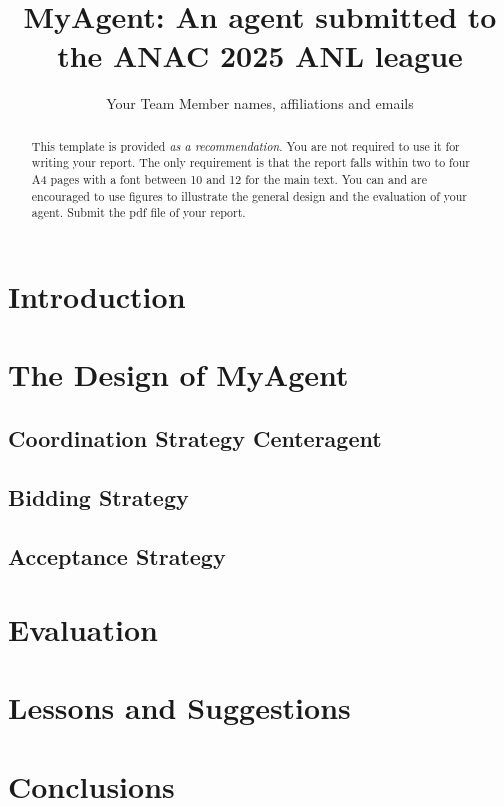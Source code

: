 \documentclass{article}
\title{MyAgent: An agent submitted to the ANAC 2025 ANL league}
\author{Your Team Member names, affiliations and emails}
\begin{document}
\maketitle
\begin{abstract}
	This template is provided \emph{as a recommendation}. You are not required
	to use it for writing your report. The only requirement is that the report
	falls within two to four A4 pages with a font between 10 and 12 for the main
	text. You can and are encouraged to use figures to illustrate the general
	design and the evaluation of your agent. Submit the pdf file of your report.
\end{abstract}
\section{Introduction}
\section{The Design of MyAgent}
\subsection{Coordination Strategy Centeragent}
\subsection{Bidding Strategy}
\subsection{Acceptance Strategy}
\section{Evaluation}
\section{Lessons and Suggestions}
\section*{Conclusions}
\end{document}

